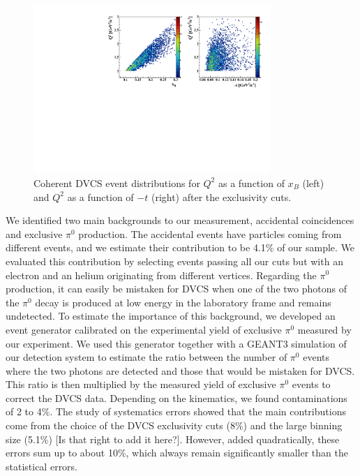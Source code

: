 \documentclass[preprint,nofootinbib,showpacs,prl,superscriptaddress,secnumarabic,amssymb,nobibnotes,aps,floatfix]{revtex4}
\begin{document}
\begin{figure}[tb]
\hspace{-0.45cm}
\includegraphics[width=9.0cm]{figs/Q2_xB_t_Coh.pdf}
\caption{Coherent DVCS event distributions for $Q^{2}$ as a function of 
$x_{B}$ (left) and $Q^{2}$ as a function of $-t$ (right) after the 
exclusivity cuts.}
\label{fig:kin-coverage}
\end{figure}

We identified two main backgrounds to our measurement, accidental 
coincidences and exclusive $\pi^0$ production. The accidental events have 
particles coming from different events, and we estimate their  contribution
to be 4.1\% of our sample. We evaluated this contribution by selecting events 
passing all our cuts but with an electron and an helium originating from different 
vertices. Regarding the $\pi^0$ production, it can easily be mistaken for DVCS when 
one of the two photons of the $\pi^0$ decay is produced at low energy in the 
laboratory frame and remains undetected. To estimate the importance of this 
background, we developed an event generator calibrated on the experimental yield 
of exclusive $\pi^0$ measured by our experiment. We used this generator together 
with a GEANT3 simulation of our detection system to estimate the ratio between
the number of $\pi^0$ events where the two photons are detected and those that 
would be mistaken for DVCS. This ratio is then multiplied by the measured yield 
of exclusive $\pi^0$ events to correct the DVCS data. Depending on the kinematics, we
found contaminations of 2 to 4\%. The study of systematics errors showed that the main 
contributions come from the choice of the DVCS exclusivity cuts (8\%) and the 
large binning size (5.1\%) [Is that right to add it here?]. However, added quadratically, these 
errors sum up to about 10\%, which always remain significantly smaller than the 
statistical errors.
\end{document}
